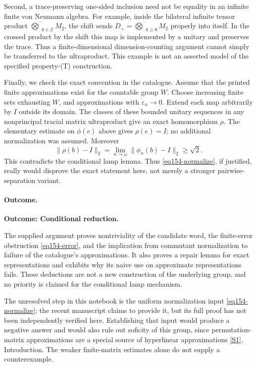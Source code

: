 \documentclass[11pt,a4paper]{article}
\newcommand{\Z}{\mathbb{Z}}
\newcommand{\eps}{\varepsilon}
\newcommand{\sref}[2]{\hyperlink{source:#1:#2}{[S#2]}}
\numberwithin{equation}{section}
\begin{document}
Second, a trace-preserving one-sided inclusion need not be equality in an
infinite finite von Neumann algebra. For example, inside the bilateral
infinite tensor product $\overline\bigotimes_{k\in\Z}M_2$, the shift sends
$D_+=\overline\bigotimes_{k\ge0}M_2$ properly into itself. In the crossed
product by the shift this map is implemented by a unitary and preserves the
trace. Thus a finite-dimensional dimension-counting argument cannot simply
be transferred to the ultraproduct. This example is not an asserted model
of the specified property-(T) construction.

Finally, we check the exact convention in the catalogue. Assume that the
printed finite approximations exist for the countable group $W$. Choose
increasing finite sets exhausting $W$, and approximations with
$\eps_n\to0$. Extend each map arbitrarily by $I$ outside its domain. The
classes of these bounded unitary sequences in any nonprincipal tracial
matrix ultraproduct give an exact homomorphism $\rho$. The elementary
estimate on $\phi(e)$ above gives $\rho(e)=I$; no additional normalization
was assumed. Moreover
\[
 \|\rho(b)-I\|_2=\lim_{n\to\omega}\|\phi_n(b)-I\|_2\ge\sqrt2.
\]
This contradicts the conditional lamp lemma. Thus
\eqref{eq154-normalize}, if justified, really would disprove the exact
statement here, not merely a stronger pairwise-separation variant.

\paragraph{Outcome.}
\textbf{Outcome: Conditional reduction.}

The supplied argument proves nontriviality of the candidate word, the
finite-error obstruction \eqref{eq154-error}, and the implication from
commutant normalization to failure of the catalogue's approximations. It
also proves a repair lemma for exact representations and exhibits why its
naive use on approximate representations fails. These deductions are not a
new construction of the underlying group, and no priority is claimed for
the conditional lamp mechanism.

The unresolved step in this notebook is the uniform normalization input
\eqref{eq154-normalize}; the recent manuscript claims to provide it, but
its full proof has not been independently verified here. Establishing that
input would produce a negative answer and would also rule out soficity of
this group, since permutation-matrix approximations are a special source
of hyperlinear approximations \sref{30006756}{1}, Introduction. The weaker
finite-matrix estimates alone do not supply a counterexample.
\end{document}

